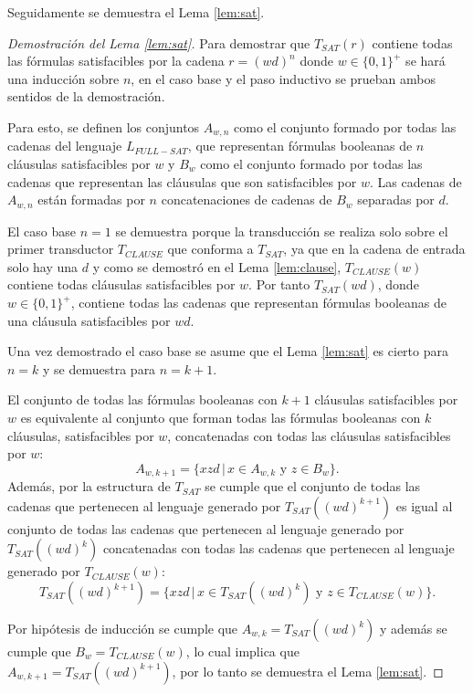 \documentclass[12pt]{article}
\begin{document}
Seguidamente se demuestra el Lema \ref{lem:sat}.

\begin{proof}[Demostración del Lema \ref{lem:sat}]
    Para demostrar que $T_{SAT}(r)$ contiene todas las fórmulas satisfacibles por la cadena $r=(wd)^n$ donde $w\in\{0,1\}^+$ se hará una inducción sobre $n$, en el caso base y el paso inductivo
    se prueban ambos sentidos de la demostración.  
    
    Para esto, se definen los conjuntos $A_{w,n}$ como el conjunto formado por todas las cadenas del lenguaje $L_{FULL-SAT}$, que representan fórmulas booleanas de $n$ cláusulas satisfacibles por $w$ y $B_w$ como el conjunto formado por todas las cadenas que representan las cláusulas que son satisfacibles por $w$. Las cadenas de $A_{w,n}$ están formadas por $n$ concatenaciones de cadenas de $B_w$ separadas por $d$.
    
    El caso base $n=1$ se demuestra porque la transducción se realiza solo sobre el primer transductor $T_{CLAUSE}$ que conforma a $T_{SAT}$, ya que en la cadena de entrada solo hay una $d$ y como se demostró en el Lema \ref{lem:clause}, $T_{CLAUSE}(w)$ contiene todas cláusulas satisfacibles por $w$. Por tanto $T_{SAT}(wd)$, donde $w\in \{0,1\}^+$, contiene todas las cadenas que representan fórmulas booleanas de una cláusula satisfacibles por $wd$.
    
    Una vez demostrado el caso base se asume que el Lema \ref{lem:sat} es cierto para $n=k$ y se demuestra para $n=k+1$.
    
    El conjunto de todas las fórmulas booleanas con $k+1$ cláusulas satisfacibles por $w$ es equivalente al conjunto que forman todas las fórmulas booleanas con $k$ cláusulas, satisfacibles por $w$, concatenadas con todas las cláusulas satisfacibles por $w$: $$A_{w,k+1}=\{xzd\,|\,x\in A_{w,k} \text{ y } z\in B_w\}.$$ Además, por la estructura de $T_{SAT}$ se cumple que el conjunto de todas las cadenas que pertenecen al lenguaje generado por $T_{SAT}((wd)^{k+1})$ es igual al conjunto de todas las cadenas que pertenecen al lenguaje generado por $T_{SAT}((wd)^{k})$ concatenadas con todas las cadenas que pertenecen al lenguaje generado por $T_{CLAUSE}(w)$:
    $$T_{SAT}((wd)^{k+1})=\{xzd\,|\,x\in T_{SAT}((wd)^{k}) \text{ y } z\in T_{CLAUSE}(w)\}.$$
    
    Por hipótesis de inducción se cumple que $A_{w,k}=T_{SAT}((wd)^{k})$ y además se cumple que $B_w=T_{CLAUSE}(w)$, lo cual implica que $A_{w,k+1}=T_{SAT}((wd)^{k+1})$, por lo tanto se demuestra el Lema \ref{lem:sat}.
\end{proof}
\end{document}
